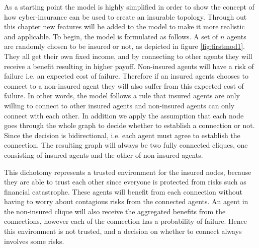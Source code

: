 As a starting point the model is highly simplified in order to show the concept of how cyber-insurance can be used to create an insurable topology. Through out this chapter new features will be added to the model to make it more realistic and applicable. To begin, the model is formulated as follows.
A set of $n$ agents are randomly chosen to be insured or not, as depicted in figure \ref{fig:firstmod1}. They all get their own fixed income, and by connecting to other agents they will receive a benefit resulting in higher payoff. Non-insured agents will have a risk of failure i.e. an expected cost of failure. Therefore if an insured agents chooses to connect to a non-insured agent they will also suffer from this expected cost of failure. In other words, the model follows a rule that insured agents are only willing to connect to other insured agents and non-insured agents can only connect with each other. In addition we apply the assumption that each node goes through the whole graph to decide whether to establish a connection or not. Since the decision is bidirectional, i.e. each agent must agree to establish the connection. The resulting graph will always be two fully connected cliques, one consisting of insured agents and the other of non-insured agents. 


This dichotomy represents a trusted environment for the insured nodes, because they are able to trust each other since everyone is protected from risks such as financial catastrophe. These agents will benefit from each connection without having to worry about contagious risks from the connected agents. 
An agent in the non-insured clique will also receive the aggregated benefits from the connections, however each of the connection has a probability of failure. Hence this environment is not trusted, and a decision on whether to connect always involves some risks. 

